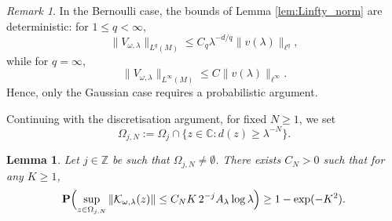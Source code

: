 \documentclass[12pt,reqno]{amsart}
\newtheorem{lemma}[theorem]{Lemma}
\theoremstyle{definition}
\theoremstyle{remark}
\newtheorem{remark}[theorem]{Remark}
\numberwithin{equation}{section}
\newcommand{\1}{\mathbbm{1}}
\newcommand{\C}{\mathbb{C}}
\begin{document}
\begin{remark}
In the Bernoulli case, the bounds of Lemma \ref{lem:Linfty_norm} are deterministic:
for $1\leq q<\infty$,
\[
\|V_{\omega,\lambda}\|_{L^{q}(M)}
\leq C_q \lambda^{-d/q}\|v(\lambda)\|_{\ell^{q}},
\]
while for $q=\infty$,
\[
\|V_{\omega,\lambda}\|_{L^{\infty}(M)}
\leq C\|v(\lambda)\|_{\ell^{\infty}}.
\]
Hence, only the Gaussian case requires a probabilistic argument.
\end{remark}


Continuing with the discretisation argument, for fixed $N\geq 1$, we set
\[
\Omega_{j,N}:=\Omega_j\cap \{z\in\C:d(z)\geq \lambda^{-N}\}.
\]

\begin{lemma}\label{prop:uniform-on-Omegaj}
Let \(j\in \mathbb Z\) be such that \(\Omega_{j,N}\neq \emptyset\). There exists $C_N>0$ such that for any $K\geq 1$,
\begin{align}\label{eq:uniform-on-Omegaj}
\mathbf P\Bigl(
\sup_{z\in \Omega_{j,N}}\|\mathcal K_{\omega,\lambda}(z)\|
\leq
C_NK\,2^{-j}A_\lambda \log \lambda
\Bigr)
\geq
1-\exp(-K^2).
\end{align}
\end{lemma}
\end{document}

